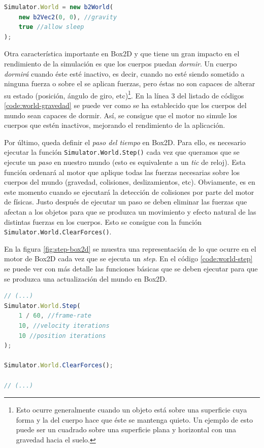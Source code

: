\begin{lstlisting}[language={Javascript},label={code:world-gravedad}, caption={Definición del objeto \texttt{World} en Box2D con gravedad 0 y permitiendo que los cuerpos sean capaces de dormir.}]
Simulator.World = new b2World(
	new b2Vec2(0, 0), //gravity
	true //allow sleep
);
\end{lstlisting}

Otra característica importante en Box2D y que tiene un gran impacto en el rendimiento de la simulación es que los cuerpos puedan \emph{dormir}. Un cuerpo \emph{dormirá} cuando éste esté inactivo, es decir, cuando no esté siendo sometido a ninguna fuerza o sobre el se aplican fuerzas, pero éstas no son capaces de alterar su estado (posición, ángulo de giro, etc)\footnote{Esto ocurre generalmente cuando un objeto está sobre una superficie cuya forma y la del cuerpo hace que éste se mantenga quieto. Un ejemplo de esto puede ser un cuadrado sobre una superficie plana y horizontal con una gravedad hacia el suelo.}. En la línea 3 del listado de códigos \ref{code:world-gravedad} se puede ver como se ha establecido que los cuerpos del mundo sean capaces de dormir. Así, se consigue que el motor no simule los cuerpos que estén inactivos, mejorando el rendimiento de la aplicación.

Por último, queda definir el \emph{paso del tiempo} en Box2D. Para ello, es necesario ejecutar la función \texttt{Simulator.World.Step()} cada vez que queramos que se ejecute un \emph{paso} en nuestro mundo (esto es equivalente a un \emph{tic} de reloj). Esta función ordenará al motor que aplique todas las fuerzas necesarias sobre los cuerpos del mundo (gravedad, colisiones, deslizamientos, etc). Obviamente, es en este momento cuando se ejecutará la detección de colisiones por parte del motor de físicas. Justo después de ejecutar un paso se deben eliminar las fuerzas que afectan a los objetos para que se produzca un movimiento y efecto natural de las distintas fuerzas en los cuerpos. Esto se consigue con la función \texttt{Simulator.World.ClearForces()}.

En la figura \ref{fig:step-box2d} se muestra una representación de lo que ocurre en el motor de Box2D cada vez que se ejecuta un \emph{step}. En el código \ref{code:world-step} se puede ver con más detalle las funciones básicas que se deben ejecutar para que se produzca una actualización del mundo en Box2D.


\begin{lstlisting}[language={Javascript},label={code:world-step}, caption={Actualización del mundo en \texttt{Box2D}.}]
// (...)
Simulator.World.Step(
	1 / 60, //frame-rate
	10, //velocity iterations
	10 //position iterations
);

Simulator.World.ClearForces();

// (...)
\end{lstlisting}

